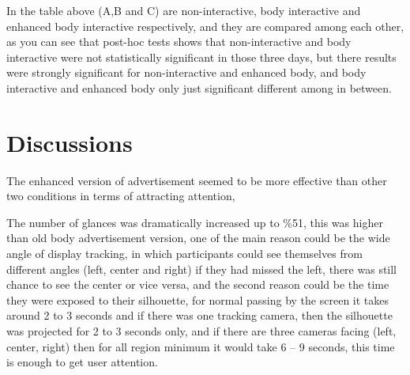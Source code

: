 \begin{enumerate}
\begin{table}[H]
\caption{Post-Hoc Tukey’s HSD}
\label{tab:engage-non-posthoctukey}
\centering
{}
\end{table}
In the table above (A,B and C) are non-interactive, body interactive and enhanced body interactive respectively, and they are compared among each other, as you can see that post-hoc tests shows that non-interactive and body interactive were not statistically significant in those three days, but there results were strongly significant for non-interactive and enhanced body, and body interactive and enhanced body only just significant different among in between. 

\end{enumerate}



\section{Discussions}

The enhanced version of advertisement seemed to be more effective than other two conditions in terms of attracting attention,

The number of glances was dramatically increased up to \%51, this was higher than old body advertisement version, one of the main reason could be the wide angle of display tracking, in which participants could see themselves from different angles (left, center and right) if they had missed the left, there was still chance to see the center or vice versa, and the second reason could be the time they were exposed to their silhouette, for normal passing by the screen it takes around 2 to 3 seconds and if there was one tracking camera, then the silhouette was projected for 2 to 3 seconds only, and if there are three cameras facing (left, center, right) then for all region minimum it would take 6 – 9 seconds, this time is enough to get user attention.


